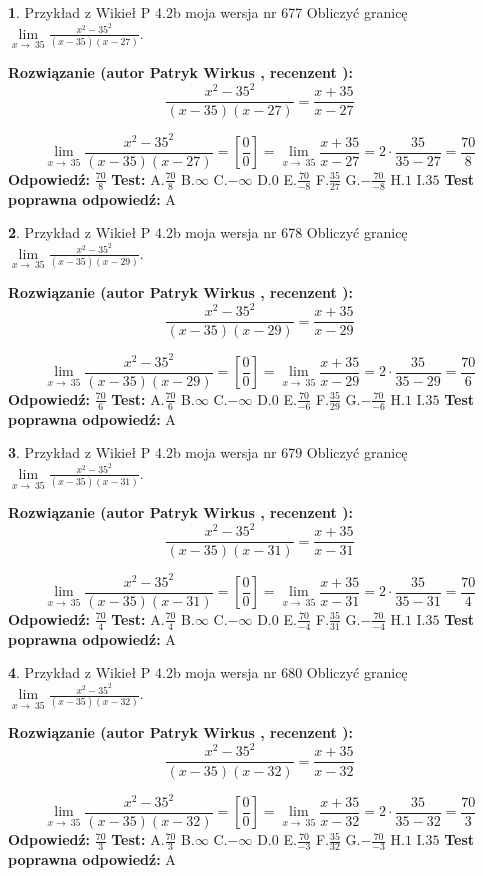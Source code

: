 \documentclass[12pt, a4paper]{article}
\theoremstyle{definition} %
\newtheorem{zad}{}
\newcommand{\zadStart}[1]{\begin{zad}#1\newline}
\newcommand{\zadStop}{\end{zad}}
\newcommand{\rozwStart}[2]{\noindent \textbf{Rozwiązanie (autor #1 , recenzent #2): }\newline}
\newcommand{\rozwStop}{\newline}
\newcommand{\odpStart}{\noindent \textbf{Odpowiedź:}\newline}
\newcommand{\odpStop}{\newline}
\newcommand{\testStart}{\noindent \textbf{Test:}\newline}
\newcommand{\testStop}{\newline}
\newcommand{\kluczStart}{\noindent \textbf{Test poprawna odpowiedź:}\newline}
\newcommand{\kluczStop}{\newline}
\begin{document}
\zadStart{Przykład z Wikieł P 4.2b moja wersja nr 677}
Obliczyć granicę $\lim\limits_{x\to\ 35}\frac{x^{2}-35^{2}}{(x-35)(x-27)}$.
\zadStop
\rozwStart{Patryk Wirkus}{}
$$\frac{x^{2}-35^{2}}{(x-35)(x-27)}=\frac{x+35}{x-27}$$

$$\lim\limits_{x\to\ 35}\frac{x^{2}-35^{2}}{(x-35)(x-27)}=[\frac{0}{0}]=\lim\limits_{x\to\ 35}\frac{x+35}{x-27}=2 \cdot \frac{35}{35-27} = \frac{70}{8}$$
\rozwStop
\odpStart
$\frac{70}{8}$
\odpStop
\testStart
A.$\frac{70}{8}$
B.$\infty$
C.$-\infty$
D.$0$
E.$\frac{70}{-8}$
F.$\frac{35}{27}$
G.$-\frac{70}{-8}$
H.$1$
I.$35$
\testStop
\kluczStart
A
\kluczStop



\zadStart{Przykład z Wikieł P 4.2b moja wersja nr 678}
Obliczyć granicę $\lim\limits_{x\to\ 35}\frac{x^{2}-35^{2}}{(x-35)(x-29)}$.
\zadStop
\rozwStart{Patryk Wirkus}{}
$$\frac{x^{2}-35^{2}}{(x-35)(x-29)}=\frac{x+35}{x-29}$$

$$\lim\limits_{x\to\ 35}\frac{x^{2}-35^{2}}{(x-35)(x-29)}=[\frac{0}{0}]=\lim\limits_{x\to\ 35}\frac{x+35}{x-29}=2 \cdot \frac{35}{35-29} = \frac{70}{6}$$
\rozwStop
\odpStart
$\frac{70}{6}$
\odpStop
\testStart
A.$\frac{70}{6}$
B.$\infty$
C.$-\infty$
D.$0$
E.$\frac{70}{-6}$
F.$\frac{35}{29}$
G.$-\frac{70}{-6}$
H.$1$
I.$35$
\testStop
\kluczStart
A
\kluczStop



\zadStart{Przykład z Wikieł P 4.2b moja wersja nr 679}
Obliczyć granicę $\lim\limits_{x\to\ 35}\frac{x^{2}-35^{2}}{(x-35)(x-31)}$.
\zadStop
\rozwStart{Patryk Wirkus}{}
$$\frac{x^{2}-35^{2}}{(x-35)(x-31)}=\frac{x+35}{x-31}$$

$$\lim\limits_{x\to\ 35}\frac{x^{2}-35^{2}}{(x-35)(x-31)}=[\frac{0}{0}]=\lim\limits_{x\to\ 35}\frac{x+35}{x-31}=2 \cdot \frac{35}{35-31} = \frac{70}{4}$$
\rozwStop
\odpStart
$\frac{70}{4}$
\odpStop
\testStart
A.$\frac{70}{4}$
B.$\infty$
C.$-\infty$
D.$0$
E.$\frac{70}{-4}$
F.$\frac{35}{31}$
G.$-\frac{70}{-4}$
H.$1$
I.$35$
\testStop
\kluczStart
A
\kluczStop



\zadStart{Przykład z Wikieł P 4.2b moja wersja nr 680}
Obliczyć granicę $\lim\limits_{x\to\ 35}\frac{x^{2}-35^{2}}{(x-35)(x-32)}$.
\zadStop
\rozwStart{Patryk Wirkus}{}
$$\frac{x^{2}-35^{2}}{(x-35)(x-32)}=\frac{x+35}{x-32}$$

$$\lim\limits_{x\to\ 35}\frac{x^{2}-35^{2}}{(x-35)(x-32)}=[\frac{0}{0}]=\lim\limits_{x\to\ 35}\frac{x+35}{x-32}=2 \cdot \frac{35}{35-32} = \frac{70}{3}$$
\rozwStop
\odpStart
$\frac{70}{3}$
\odpStop
\testStart
A.$\frac{70}{3}$
B.$\infty$
C.$-\infty$
D.$0$
E.$\frac{70}{-3}$
F.$\frac{35}{32}$
G.$-\frac{70}{-3}$
H.$1$
I.$35$
\testStop
\kluczStart
A
\kluczStop
\end{document}
